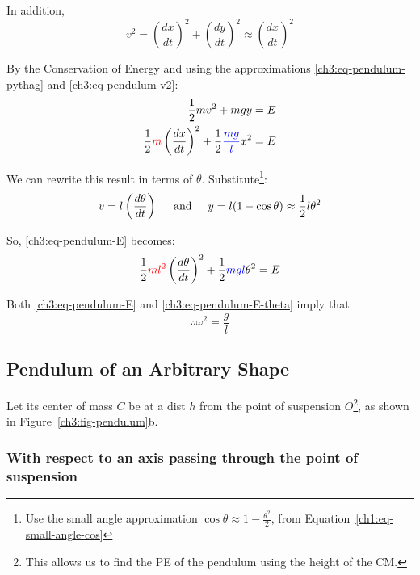 \documentclass[11pt,letterpaper,titlepage,oneside]{book}
\newcommand{\htab}{\hspace{0.5cm}}
\newcommand{\andd}{\htab\text{and}\htab}
\newcommand{\kcol}[1]{\textcolor{blue}{#1}}
\newcommand{\mcol}[1]{\textcolor{red}{#1}}
\begin{document}
In addition,
\begin{equation}
v^2=\left( \frac{dx}{dt} \right)^2 + \left(\frac{dy}{dt} \right)^2
\approx  \left( \frac{dx}{dt} \right)^2 \label{ch3:eq-pendulum-v2}
\end{equation}

By the Conservation of Energy and using the approximations \eqref{ch3:eq-pendulum-pythag} and  \eqref{ch3:eq-pendulum-v2}:
\begin{align}
\frac{1}{2} mv^2 + mgy &= E \notag \\
\frac{1}{2} \mcol{m} \left( \frac{dx}{dt} \right)^2 + \frac{1}{2} \kcol{\frac{mg}{l}} x^2 &= E  \label{ch3:eq-pendulum-E}
\end{align}


We can rewrite this result in terms of $\theta$. Substitute\footnote{Use the small angle approximation $\cos\theta \approx 1-\frac{\theta^2}{2}$, from Equation~\eqref{ch1:eq-small-angle-cos}}:
\begin{equation*}
v = l\left(\frac{d\theta}{dt}\right) \andd
y = l(1-\cos\theta) \approx \frac{1}{2}l\theta ^2
\end{equation*}

So, \eqref{ch3:eq-pendulum-E} becomes:
\begin{equation}
	\frac{1}{2} \mcol{ml^2} \left( \frac{d\theta}{dt} \right)^2 + \frac{1}{2} \kcol{mgl} \theta^2 = E \label{ch3:eq-pendulum-E-theta}
\end{equation}

Both \eqref{ch3:eq-pendulum-E} and \eqref{ch3:eq-pendulum-E-theta} imply that:
\begin{equation}
	\therefore \omega^2 = \frac{g}{l} \label{ch3:eq-simple-pendulum-result}
\end{equation}


\subsection{Pendulum of an Arbitrary Shape} \label{ch3:sec-complex-pendulum}
Let its center of mass $C$ be at a dist $h$ from the point of suspension $O$\footnote{This allows us to find the PE of the pendulum using the height of the CM.}, as shown in Figure~\ref{ch3:fig-pendulum}b.

\subsubsection{With respect to an axis passing through the point of suspension}
\end{document}
